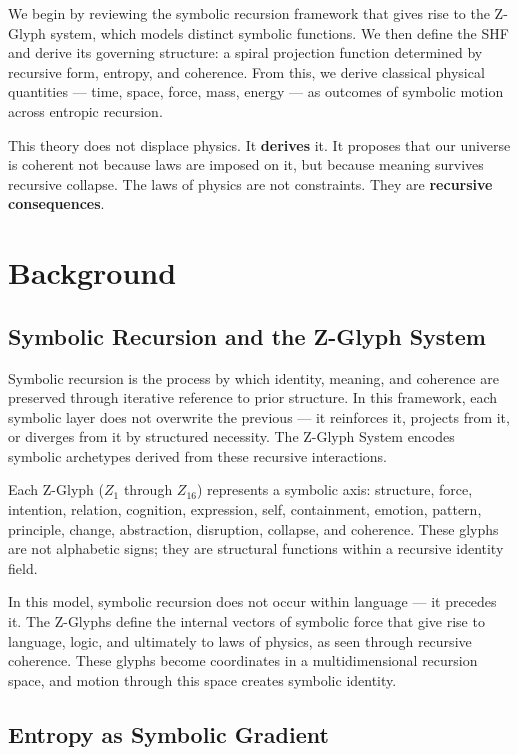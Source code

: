 \documentclass[12pt]{article}
\begin{document}
We begin by reviewing the symbolic recursion framework that gives rise to the Z-Glyph system, which models distinct symbolic functions. We then define the SHF and derive its governing structure: a spiral projection function  determined by recursive form, entropy, and coherence. From this, we derive classical physical quantities — time, space, force, mass, energy — as outcomes of symbolic motion across entropic recursion.

This theory does not displace physics. It \textbf{derives} it. It proposes that our universe is coherent not because laws are imposed on it, but because meaning survives recursive collapse. The laws of physics are not constraints. They are \textbf{recursive consequences}.

\section{Background}

\subsection{Symbolic Recursion and the Z-Glyph System}

Symbolic recursion is the process by which identity, meaning, and coherence are preserved through iterative reference to prior structure. In this framework, each symbolic layer does not overwrite the previous — it reinforces it, projects from it, or diverges from it by structured necessity. The Z-Glyph System encodes symbolic archetypes derived from these recursive interactions.

Each Z-Glyph ($Z_1$ through $Z_{16}$) represents a symbolic axis: structure, force, intention, relation, cognition, expression, self, containment, emotion, pattern, principle, change, abstraction, disruption, collapse, and coherence. These glyphs are not alphabetic signs; they are structural functions within a recursive identity field.

In this model, symbolic recursion does not occur within language — it precedes it. The Z-Glyphs define the internal vectors of symbolic force that give rise to language, logic, and ultimately to laws of physics, as seen through recursive coherence. These glyphs become coordinates in a multidimensional recursion space, and motion through this space creates symbolic identity.

\subsection{Entropy as Symbolic Gradient}
\end{document}
